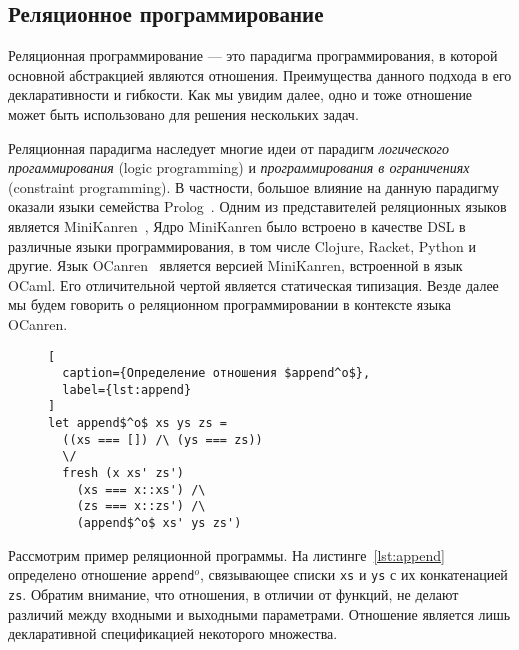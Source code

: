 \subsection{Реляционное программирование}

\label{sec:relprog}

Реляционная программирование --- это парадигма программирования, 
в которой основной абстракцией являются отношения.
Преимущества данного подхода в его декларативности и гибкости.
Как мы увидим далее, одно и тоже отношение может быть использовано 
для решения нескольких задач. 

Реляционная парадигма наследует многие идеи от 
парадигм \emph{логического прогаммирования} (logic programming) и 
\emph{программирования в ограничениях} (constraint programming).
В частности, большое влияние на данную парадигму оказали 
языки семейства Prolog~\cite{swift2012xsb, wielemaker2012swi, nadathur1988overview}.
Одним из представителей реляционных языков является 
MiniKanren~\cite{kiselyov2005backtracking, friedman2005reasoned, friedmanmukanren, byrd2009relational}, 
Ядро MiniKanren было встроено в качестве DSL в различные языки программирования,
в том числе Clojure, Racket, Python и другие.
Язык OCanren~\cite{kosarev2016typed} является версией MiniKanren, встроенной в язык OCaml.
Его отличительной чертой является статическая типизация. 
Везде далее мы будем говорить о реляционном программировании в контексте языка OCanren.

\begin{figure}[hbt]
\begin{minipage}{\linewidth}
\begin{lstlisting}[
  caption={Определение отношения $append^o$},
  label={lst:append}
]
let append$^o$ xs ys zs =
  ((xs === []) /\ (ys === zs))
  \/
  fresh (x xs' zs')
    (xs === x::xs') /\
    (zs === x::zs') /\
    (append$^o$ xs' ys zs')
\end{lstlisting}
\end{minipage}
\end{figure}

Рассмотрим пример реляционной программы. 
На листинге~\ref{lst:append} определено отношение 
\texttt{append$^o$}, связывающее списки \texttt{xs} и \texttt{ys} 
с их конкатенацией \texttt{zs}.
Обратим внимание, что отношения, в отличии от функций, 
не делают различий между входными и выходными параметрами.
Отношение является лишь декларативной спецификацией некоторого множества.

